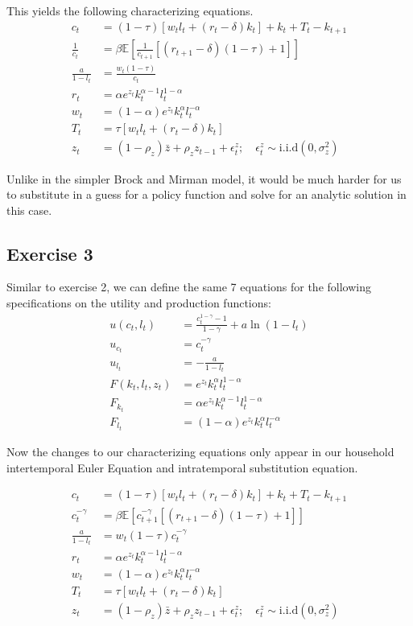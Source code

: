 \documentclass{article}
\begin{document}
	This yields the following characterizing equations.
	\begin{align*}
	c_t &= (1 -\tau)[w_t l_t + (r_t - \delta)k_t] + k_t + T_t - k_{t+1} \\
	\frac{1}{c_t} &= \beta \mathbb{E}\left[ \frac{1}{c_{t+1}}[(r_{t+1} - \delta)(1 -\tau) + 1] \right] \\
	\frac{a}{1 -l_t} &= \frac{w_t (1-\tau)}{c_t} \\
	r_t &= \alpha e^{z_t} k_t^{\alpha - 1} l_t^{1 - \alpha} \\
	w_t &= (1 -\alpha) e^{z_t} k_t^{\alpha} l_t^{-\alpha} \\
	T_t &= \tau[w_t l_t + (r_t - \delta) k_t] \\
	z_t &= (1 - \rho_z)\bar{z} + \rho_z z_{t-1} + \epsilon^z_t; \quad \epsilon_t^z \sim \text{i.i.d}(0, \sigma_z^2)
	\end{align*}
	
	Unlike in the simpler Brock and Mirman model, it would be much harder for us to substitute in a guess for a policy function and solve for an analytic solution in this case. 
	
	\subsection*{Exercise 3}
	Similar to exercise 2, we can define the same 7 equations for the following specifications on the utility and production functions:
	\begin{align*}
	u(c_t, l_t) &= \frac{c_t^{1 - \gamma} - 1}{1 - \gamma} + a \ln(1 - l_t) \\
	u_{c_t} &= c_t^{-\gamma} \\
	u_{l_t} &= -\frac{a}{1-l_t} \\
	F(k_t, l_t, z_t) &= e^{z_t} k_t^{\alpha} l_t^{1 - \alpha} \\
	F_{k_t} &= \alpha e^{z_t} k_t^{\alpha - 1} l_t^{1 - \alpha} \\
	F_{l_t} &= (1 -\alpha) e^{z_t} k_t^{\alpha} l_t^{-\alpha}
	\end{align*}
	
	Now the changes to our characterizing equations only appear in our household intertemporal Euler Equation and intratemporal substitution equation.
	
	\begin{align*}
	c_t &= (1 -\tau)[w_t l_t + (r_t - \delta)k_t] + k_t + T_t - k_{t+1} \\
	c_t^{-\gamma} &= \beta \mathbb{E}\left[c_{t+1}^{-\gamma}[(r_{t+1} - \delta)(1 -\tau) + 1] \right] \\
	\frac{a}{1 -l_t} &= w_t (1-\tau)c_t^{-\gamma} \\
	r_t &= \alpha e^{z_t} k_t^{\alpha - 1} l_t^{1 - \alpha} \\
	w_t &= (1 -\alpha) e^{z_t} k_t^{\alpha} l_t^{-\alpha} \\
	T_t &= \tau[w_t l_t + (r_t - \delta) k_t] \\
	z_t &= (1 - \rho_z)\bar{z} + \rho_z z_{t-1} + \epsilon^z_t; \quad \epsilon_t^z \sim \text{i.i.d}(0, \sigma_z^2)
	\end{align*}
	
\end{document}

